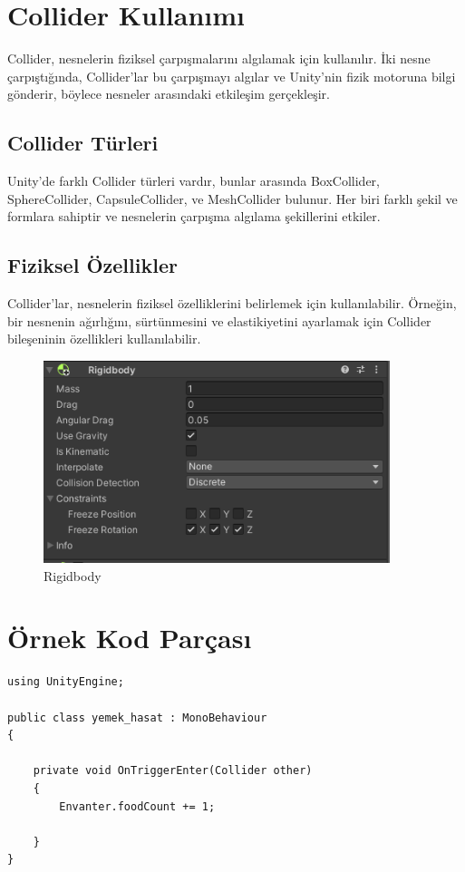 \documentclass{article}
\begin{document}
\section{Collider Kullanımı}

Collider, nesnelerin fiziksel çarpışmalarını algılamak için kullanılır. İki nesne çarpıştığında, Collider'lar bu çarpışmayı algılar ve Unity'nin fizik motoruna bilgi gönderir, böylece nesneler arasındaki etkileşim gerçekleşir.

\subsection{Collider Türleri}

Unity'de farklı Collider türleri vardır, bunlar arasında BoxCollider, SphereCollider, CapsuleCollider, ve MeshCollider bulunur. Her biri farklı şekil ve formlara sahiptir ve nesnelerin çarpışma algılama şekillerini etkiler.
\subsection{Fiziksel Özellikler}

Collider'lar, nesnelerin fiziksel özelliklerini belirlemek için kullanılabilir. Örneğin, bir nesnenin ağırlığını, sürtünmesini ve elastikiyetini ayarlamak için Collider bileşeninin özellikleri kullanılabilir.

\begin{figure}[h]
    \centering
    \includegraphics[width=0.9\textwidth]{rigidbody.PNG}
    \caption{Rigidbody}
    \label{fig:resim12}
\end{figure}
\clearpage
\section{Örnek Kod Parçası}

\begin{verbatim}
using UnityEngine;

public class yemek_hasat : MonoBehaviour
{
    
    private void OnTriggerEnter(Collider other)
    {
        Envanter.foodCount += 1;
        
    }
}
\end{verbatim}
\end{document}
